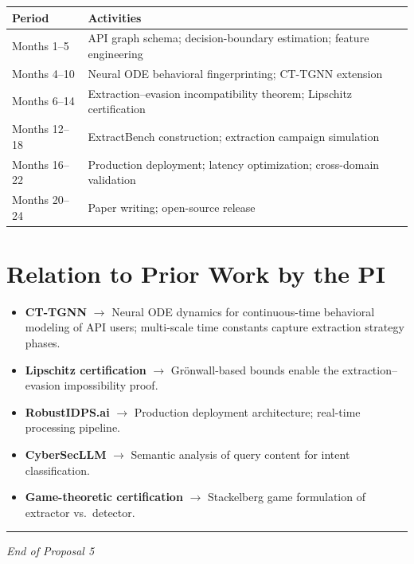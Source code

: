\documentclass[12pt,a4paper]{article}
\begin{document}
\begin{table}[H]
\centering
\begin{tabularx}{\textwidth}{@{}lX@{}}
\toprule
\textbf{Period} & \textbf{Activities} \\
\midrule
Months 1--5 & API graph schema; decision-boundary estimation; feature engineering \\
Months 4--10 & Neural ODE behavioral fingerprinting; CT-TGNN extension \\
Months 6--14 & Extraction--evasion incompatibility theorem; Lipschitz certification \\
Months 12--18 & ExtractBench construction; extraction campaign simulation \\
Months 16--22 & Production deployment; latency optimization; cross-domain validation \\
Months 20--24 & Paper writing; open-source release \\
\bottomrule
\end{tabularx}
\end{table}

\section{Relation to Prior Work by the PI}

\begin{itemize}
    \item \textbf{CT-TGNN} $\to$ Neural ODE dynamics for continuous-time behavioral modeling of API users; multi-scale time constants capture extraction strategy phases.
    \item \textbf{Lipschitz certification} $\to$ Gr\"onwall-based bounds enable the extraction--evasion impossibility proof.
    \item \textbf{RobustIDPS.ai} $\to$ Production deployment architecture; real-time processing pipeline.
    \item \textbf{CyberSecLLM} $\to$ Semantic analysis of query content for intent classification.
    \item \textbf{Game-theoretic certification} $\to$ Stackelberg game formulation of extractor vs.\ detector.
\end{itemize}

\vspace{1cm}
\hrule
\vspace{0.3cm}
\begin{center}
\textit{End of Proposal 5}
\end{center}
\end{document}
